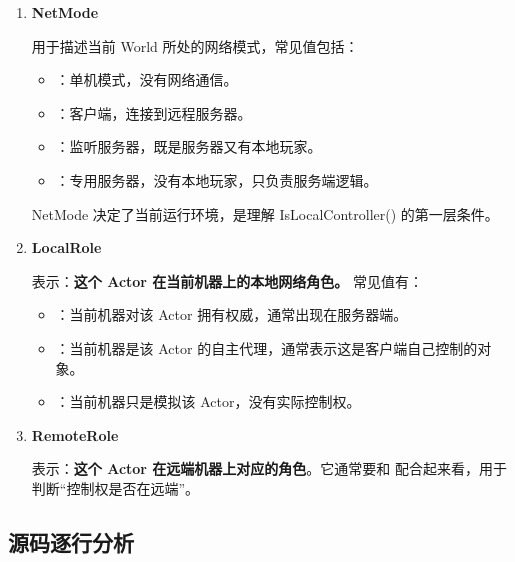 \begin{enumerate}
	\item \textbf{NetMode}
	
	 用于描述当前 World 所处的网络模式，常见值包括：
	\begin{itemize}
		\item {}：单机模式，没有网络通信。
		\item {}：客户端，连接到远程服务器。
		\item {}：监听服务器，既是服务器又有本地玩家。
		\item {}：专用服务器，没有本地玩家，只负责服务端逻辑。
	\end{itemize}
	
	NetMode 决定了当前运行环境，是理解 IsLocalController() 的第一层条件。
	
	\item \textbf{LocalRole}
	
	 表示：\textbf{这个 Actor 在当前机器上的本地网络角色。}
	常见值有：
	\begin{itemize}
		\item {}：当前机器对该 Actor 拥有权威，通常出现在服务器端。
		\item {}：当前机器是该 Actor 的自主代理，通常表示这是客户端自己控制的对象。
		\item {}：当前机器只是模拟该 Actor，没有实际控制权。
	\end{itemize}
	
	\item \textbf{RemoteRole}
	
	表示：\textbf{这个 Actor 在远端机器上对应的角色}。它通常要和  配合起来看，用于判断“控制权是否在远端”。
\end{enumerate}

\subsection{源码逐行分析}

